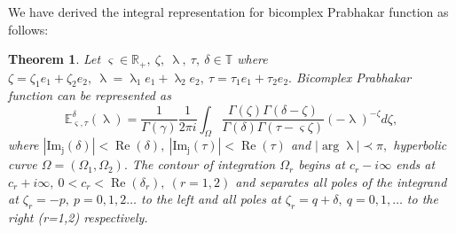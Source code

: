 \documentclass[a4paper,12pt]{article}
\newtheorem{theorem}{Theorem}[section]
\theoremstyle{remark}
\begin{document}
    We have derived the integral representation for bicomplex Prabhakar function as follows:
\begin{theorem}
    Let $ \varsigma\in \mathbb{R}_+,~\zeta,~\uplambda ,~\tau,~\delta\in \mathds{T} $ where $\zeta=\zeta_1e_1+\zeta_2e_2, ~\uplambda =\uplambda _1e_1+\uplambda _2e_2,~\tau=\tau_1e_1+\tau_2e_2 .$ Bicomplex
 Prabhakar function	can be represented as 
\begin{equation}
\mathbb{E}^\delta_{ \varsigma,\tau}(\uplambda)=\frac{1}{\Gamma(\gamma)}\frac{1}{2\pi i}\int_{\Omega}	\frac{\Gamma(\zeta)\Gamma(\delta-\zeta)}{\Gamma(\delta)\Gamma(\tau- \varsigma \zeta)}(-\uplambda )^{-\zeta}d\zeta,
\end{equation}
where	
	 $|\operatorname{Im_j}(\delta)|<\operatorname{Re}(\delta), ~|\operatorname{Im_j}(\tau)|<\operatorname{Re}(\tau)$ and $|\arg \uplambda|\prec\pi,$ hyperbolic curve $\Omega=(\Omega_1,\Omega_2).$
    The contour of integration $\Omega_r$ begins at $ c_r-i\infty$ ends at $ c_r+i\infty,~0<c_r<\operatorname{Re}(\delta_r),~(r=1,2)$ and separates all poles of the integrand at $\zeta_r
    =-p,~p=0,1,2\dots$ to the left and all poles at $\zeta_r= q+\delta,~q=0,1,\dots$ to the right (r=1,2) respectively.\\
    
	
\end{theorem}
\end{document}
